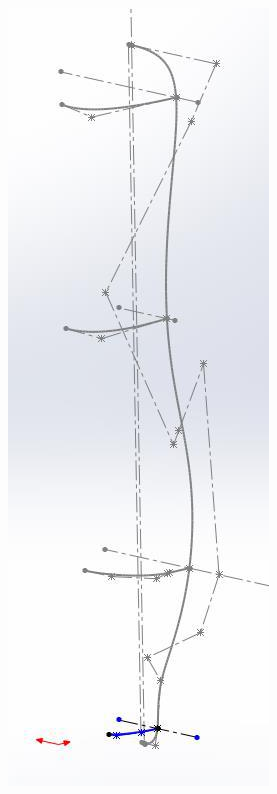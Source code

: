 \begin{figure}
\begin{subfigure}[m]{.3\linewidth}
        \includegraphics[width=\textwidth]{assets/conception1/img172.jpg}
    \end{subfigure}
\end{figure}

